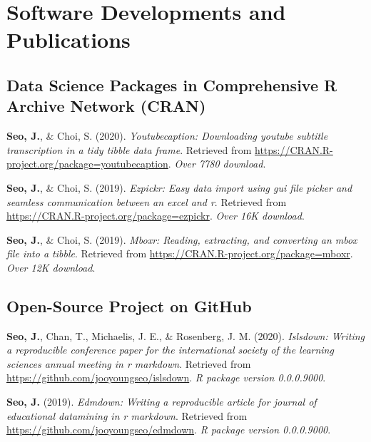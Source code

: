 \documentclass[11pt, a4paper]{awesome-cv}
\begin{document}
\hypertarget{software-developments-and-publications}{%
\section{Software Developments and
Publications}\label{software-developments-and-publications}}

\hypertarget{data-science-packages-in-comprehensive-r-archive-network-cran}{%
\subsection{Data Science Packages in Comprehensive R Archive Network
(CRAN)}\label{data-science-packages-in-comprehensive-r-archive-network-cran}}

\hypertarget{refs_R_packages}{}
\leavevmode\hypertarget{ref-R-youtubecaption}{}%
\textbf{Seo, J.}, \& Choi, S. (2020). \emph{Youtubecaption: Downloading
youtube subtitle transcription in a tidy tibble data frame}. Retrieved
from \url{https://CRAN.R-project.org/package=youtubecaption}. \emph{Over
7780 download}.

\leavevmode\hypertarget{ref-R-ezpickr}{}%
\textbf{Seo, J.}, \& Choi, S. (2019). \emph{Ezpickr: Easy data import
using gui file picker and seamless communication between an excel and
r}. Retrieved from \url{https://CRAN.R-project.org/package=ezpickr}.
\emph{Over 16K download}.

\leavevmode\hypertarget{ref-R-mboxr}{}%
\textbf{Seo, J.}, \& Choi, S. (2019). \emph{Mboxr: Reading, extracting,
and converting an mbox file into a tibble}. Retrieved from
\url{https://CRAN.R-project.org/package=mboxr}. \emph{Over 12K
download}.

\hypertarget{open-source-project-on-github}{%
\subsection{Open-Source Project on
GitHub}\label{open-source-project-on-github}}

\hypertarget{refs_github_projects}{}
\leavevmode\hypertarget{ref-R-islsdown}{}%
\textbf{Seo, J.}, Chan, T., Michaelis, J. E., \& Rosenberg, J. M.
(2020). \emph{Islsdown: Writing a reproducible conference paper for the
international society of the learning sciences annual meeting in r
markdown}. Retrieved from \url{https://github.com/jooyoungseo/islsdown}.
\emph{R package version 0.0.0.9000}.

\leavevmode\hypertarget{ref-R-edmdown}{}%
\textbf{Seo, J.} (2019). \emph{Edmdown: Writing a reproducible article
for journal of educational datamining in r markdown}. Retrieved from
\url{https://github.com/jooyoungseo/edmdown}. \emph{R package version
0.0.0.9000}.
\end{document}
